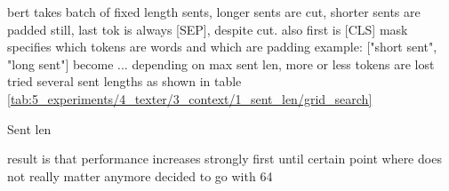 bert takes batch of fixed length sents, longer sents are cut, shorter sents are padded
still, last tok is always [SEP], despite cut. also first is [CLS]
mask specifies which tokens are words and which are padding
example: ["short sent", "long sent"] become ...
depending on max sent len, more or less tokens are lost
tried several sent lengths as shown in table \ref{tab:5_experiments/4_texter/3_context/1_sent_len/grid_search}

\begin{table}[h]
    \centering
    
    \caption{Sent len}
    \label{tab:5_experiments/4_texter/3_context/1_sent_len/grid_search}
\end{table}

result is that performance increases strongly first until certain point where does not really matter anymore
decided to go with 64
